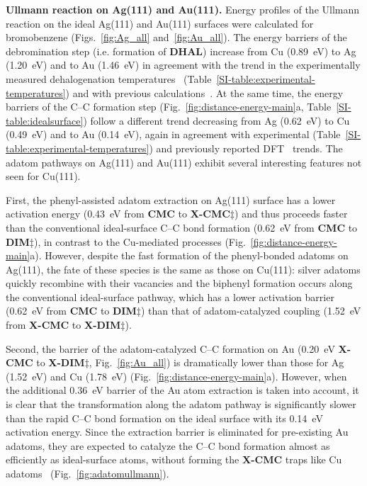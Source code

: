 \documentclass[aps,prb,amsmath,amssymb,11pt]{revtex4-1}
\newcommand{\zhzh}{\color{black}}
\renewcommand{\sout}[1]{\unskip}
\begin{document}
\textbf{Ullmann reaction on Ag(111) and Au(111).}
%
Energy profiles of the Ullmann reaction on the ideal Ag(111) and Au(111) surfaces were calculated for bromobenzene (Figs.~\ref{fig:Ag_all} and~\ref{fig:Au_all}). 
The energy barriers of the debromination step {\zhzh (i.e. formation of \textbf{DHAL})} increase from Cu (\SI{0.89}{\electronvolt}) to Ag (\SI{1.20}{\electronvolt}) and to Au (\SI{1.46}{\electronvolt}) in agreement with the trend in the experimentally measured dehalogenation temperatures~\cite{ullmann_52,ullmann_87,ullmann_67} (Table~\ref{SI-table:experimental-temperatures}) and with previous calculations~\cite{jacs2013}.
At the same time, the energy barriers of the C--C formation step (Fig.~\ref{fig:distance-energy-main}a, Table~\ref{SI-table:idealsurface}) follow a different trend decreasing from Ag (\SI{0.62}{\electronvolt}) to Cu (\SI{0.49}{\electronvolt}) and to Au (\SI{0.14}{\electronvolt}), again in agreement with experimental (Table~\ref{SI-table:experimental-temperatures}) and previously reported DFT~\cite{jacs2013} trends. The adatom pathways on Ag(111) and Au(111) exhibit several interesting features not seen for Cu(111).

First, the phenyl-assisted adatom extraction on Ag(111) surface has a lower activation energy (\SI{0.43}{\electronvolt} {\zhzh from \textbf{CMC} to \textbf{X-CMC$\ddagger$}}) \sout{along the $[11\bar{2}]$ pathway} and thus proceeds faster than the conventional ideal-surface C--C bond formation (\SI{0.62}{\electronvolt} {\zhzh from \textbf{CMC} to \textbf{DIM}$\ddagger$}), in contrast to the Cu-mediated processes (Fig.~\ref{fig:distance-energy-main}a). However, despite the fast formation of the phenyl-bonded adatoms on Ag(111), the fate of these species is the same as those on Cu(111): silver adatoms quickly recombine with their vacancies and the biphenyl formation occurs along the conventional ideal-surface pathway, which has a lower activation barrier (\SI{0.62}{\electronvolt} {\zhzh from \textbf{CMC} to \textbf{DIM}$\ddagger$}) than that of adatom-catalyzed coupling (\SI{1.52}{\electronvolt} {\zhzh from \textbf{X-CMC} to \textbf{X-DIM}$\ddagger$}).

Second, the barrier of the adatom-catalyzed C--C formation on Au (\SI{0.20}{\electronvolt} {\zhzh \textbf{X-CMC} to \textbf{X-DIM}$\ddagger$, Fig.~\ref{fig:Au_all}}) is dramatically lower than those for Ag (\SI{1.52}{\electronvolt}) and Cu (\SI{1.78}{\electronvolt}) (Fig.~\ref{fig:distance-energy-main}a). 
However, when the additional \SI{0.36}{\electronvolt} barrier of the Au atom extraction is taken into account, it is clear that
the transformation along the adatom pathway is significantly slower \sout{at the typical temperatures of the Ullmann reaction on Au (Table~\ref{SI-table:experimental-temperatures})} than the rapid C--C bond formation on the ideal surface with its \SI{0.14}{\electronvolt} activation energy. 
Since the extraction barrier is eliminated for pre-existing Au adatoms, they are expected to catalyze the C--C bond formation almost as efficiently as ideal-surface atoms, without forming the \textbf{X-CMC} traps like Cu adatoms~\cite{ullmann_65} (Fig.~\ref{fig:adatomullmann}).
\end{document}
